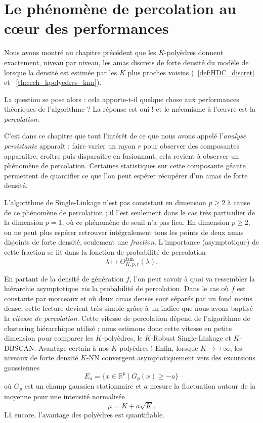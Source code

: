 \chapter{Le phénomène de percolation au c\oe{}ur des performances}
\label{sec:chap_percolation}

Nous avons montré au chapitre précédent que les $K$-polyèdres donnent exactement, niveau par niveau, les amas discrets de forte densité du modèle de  lorsque la densité est estimée par les $K$ plus proches voisins (\Def~\ref{def:HDC_discret} et \Th~\ref{th:cech_kpolyedres_knn}). 

La question se pose alors : cela apporte-t-il quelque chose aux performances théoriques de l'algorithme ?
La réponse est oui ! et le mécanisme à l'œuvre est la \emph{percolation}. 

C'est dans ce chapitre que tout l'intérêt de ce que nous avons appelé l'\emph{analyse persistante} apparaît : faire varier un rayon $r$ pour observer des composantes apparaître, croître puis disparaître en fusionnant, cela revient à observer un phénomène de percolation. Certaines statistiques sur cette composante géante permettent de quantifier ce que l'on peut espérer récupérer d'un amas de forte densité.

L'algorithme de Single-Linkage n'est pas consistant en dimension $p \ge 2$ à cause de ce phénomène de percolation ; il l'est seulement dans le cas très particulier de la dimension $p=1$, où ce phénomène de seuil n'a pas lieu. En dimension $p \ge 2$, on ne peut plus espérer retrouver intégralement tous les points de deux amas disjoints de forte densité, seulement une \emph{fraction}. L'importance (asymptotique) de cette fraction se lit dans la fonction de probabilité de percolation
\[
    \lambda\longmapsto \Theta^{\mathrm{fam}}_{K,p,r}(\lambda).
\]

En partant de la densité de génération $f$, l'on peut savoir à quoi va ressembler la hiérarchie asymptotique \emph{via} la probabilité de percolation. Dans le cas où $f$ est constante par morceaux et où deux amas denses sont séparés par un fond moins dense, cette lecture devient très simple grâce à un indice que nous avons baptisé la \emph{vitesse de percolation}.
Cette vitesse de percolation dépend de l'algorithme de clustering hiérarchique utilisé ; nous estimons donc cette vitesse en petite dimension pour comparer les $K$-polyèdres, le $K$-Robust Single-Linkage et $K$-DBSCAN.
Avantage certain à nos $K$-polyèdres !
Enfin, lorsque $K\to+\infty$, les niveaux de forte densité $K$-NN convergent asymptotiquement vers des excursions gaussiennes
\[
    E_a=\{x\in\mathbb R^p\mid G_p(x)\ge -a\}
\]
où $G_p$ est un champ gaussien stationnaire et $a$ mesure la fluctuation autour de la moyenne pour une intensité normalisée
\[
    \mu = K+a\sqrt K.
\]
Là encore, l'avantage des polyèdres est quantifiable.


